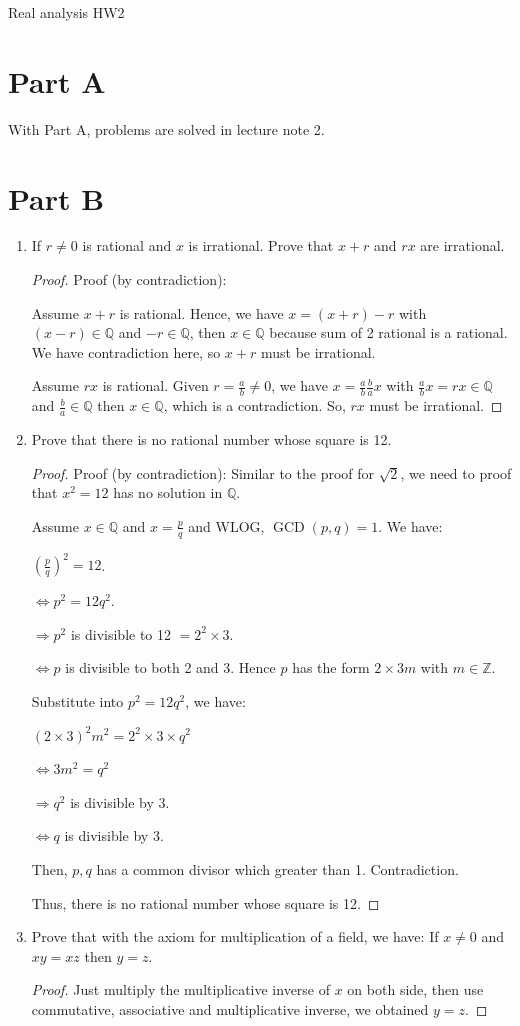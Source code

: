 \documentclass[12pt]{article}
\newcommand{\ZZ}{\mathbb{Z}}
\newcommand{\QQ}{\mathbb{Q}}
\newcommand\solproof[1]{\begin{mdframed}
\begin{proof} #1
\end{proof}
\end{mdframed}}
\begin{document}
\begin{center}
  {\large Real analysis HW2}
\end{center}
\section{Part A}
With Part A, problems are solved in lecture note 2.
\section{Part B}

\begin{enumerate}
\item If $r \neq 0$ is rational and $x$ is irrational. Prove that $x+r$ and $rx$ are irrational.  

\solproof{
Proof (by contradiction):

Assume $x+r$ is rational. Hence, we have $x = (x+r) - r$ with $(x-r) \in \QQ$ and $-r \in \QQ$, then $x \in \QQ$ because sum of 2 rational is a rational. We have contradiction here, so $x+r$ must be irrational.

Assume $rx$ is rational. Given $r = \frac{a}{b}\neq 0$, we have $x = \frac{a}{b}\frac{b}{a}x$ with $\frac{a}{b}x = rx \in \QQ$ and $\frac{b}{a}\in\QQ$ then $x \in \QQ$, which is a contradiction. So, $rx$ must be irrational.
}

\item Prove that there is no rational number whose square is 12.  

\solproof{
Proof (by contradiction):
Similar to the proof for $\sqrt{2}$, we need to proof that $x^2 = 12$ has no solution in $\QQ$.

Assume $x \in \QQ$ and $x = \frac{p}{q}$ and WLOG, $\operatorname{GCD}(p,q)=1$. We have:

$(\frac{p}{q})^2 = 12$.

$\Leftrightarrow p^2 = 12q^2$.

$\Rightarrow p^2$ is divisible to 12 $= 2^2 \times 3$.

$\Leftrightarrow p$ is divisible to both 2 and 3. Hence $p$ has the form $2\times 3 m$ with $m \in \ZZ$.

Substitute into $p^2 = 12q^2$, we have:

$(2\times3)^2m^2 = 2^2\times 3\times q^2$

$\Leftrightarrow 3m^2 = q^2$

$\Rightarrow q^2$ is divisible by 3.

$\Leftrightarrow q$ is divisible by 3.

Then, $p,q$ has a common divisor which greater than 1. Contradiction.

Thus, there is no rational number whose square is 12.
}


\item Prove that with the axiom for multiplication of a field, we have: If $x \neq 0$ and $xy=xz$ then $y=z$.  
\solproof{
Just multiply the multiplicative inverse of $x$ on both side, then use commutative, associative and multiplicative inverse, we obtained $y=z$.
}



\end{enumerate}
\end{document}
